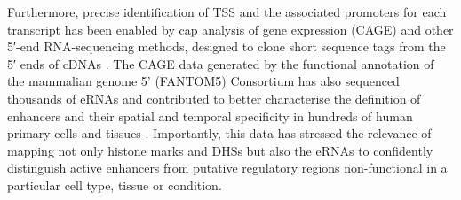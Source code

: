 Furthermore, precise identification of TSS and the associated promoters for each transcript  has been enabled by cap analysis of gene expression (CAGE) and other 5′-end RNA-sequencing methods, designed to clone short sequence tags from the 5′ ends of cDNAs \parencite{Yamashita2011,FANTOM2014}. The CAGE data generated by the functional annotation of the mammalian genome 5' (FANTOM5) Consortium has also sequenced thousands of eRNAs and contributed to better characterise the definition of enhancers and their spatial and temporal specificity in hundreds of human primary cells and tissues \parencite{Andersson2014}. Importantly, this data has stressed the relevance of mapping not only histone marks and DHSs but also the eRNAs to confidently distinguish active enhancers from putative regulatory regions non-functional in a particular cell type, tissue or condition.


